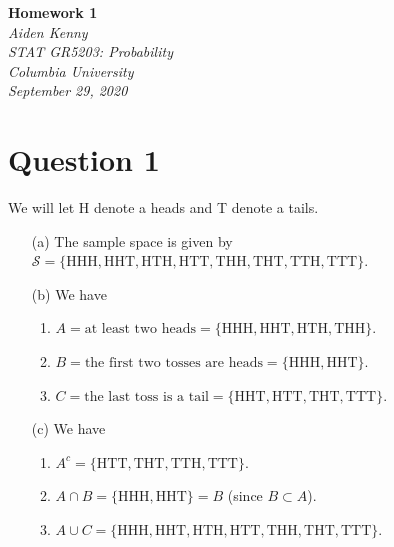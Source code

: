 \documentclass[10pt]{article}
\begin{document}
\newcommand{\mytitle}{Homework 1}
\newcommand{\myauthor}{Aiden Kenny}
\newcommand{\myclass}{STAT GR5203: Probability}
\newcommand{\myschool}{Columbia University}
\newcommand{\mydate}{September 29, 2020}
\begin{flushright}
    \textbf{\mytitle}\\[0.5em]
    \textsl{\myauthor}\\
    \textsl{\myclass}\\
    \textsl{\myschool}\\
    \textsl{\mydate}
\end{flushright} \vspace{1em}

\section{Question 1} \noindent
We will let H denote a heads and T denote a tails.
\begin{itemize}
    \item[(a)] The sample space is given by \(\mathcal{S} = \{\mathrm{HHH, HHT, HTH, HTT, THH, THT, TTH, TTT}\}\).
    \item[(b)] We have
    \begin{enumerate}
        \item \(A = \text{at least two heads} = \{\mathrm{HHH, HHT, HTH, THH}\}\).
        \item \(B = \text{the first two tosses are heads} = \{\mathrm{HHH, HHT}\}\).
        \item \(C = \text{the last toss is a tail} = \{\mathrm{HHT, HTT, THT, TTT}\}\).
    \end{enumerate}
    \item[(c)] We have 
    \begin{enumerate}
        \item \(A^c = \{\mathrm{HTT, THT, TTH, TTT}\}\).
        \item \(A \cap B = \{\mathrm{HHH, HHT}\} = B\) (since \(B \subset A\)).
        \item \(A \cup C = \{\mathrm{HHH, HHT, HTH, HTT, THH, THT, TTT}\}\).
    \end{enumerate}
\end{itemize}

\end{document}
